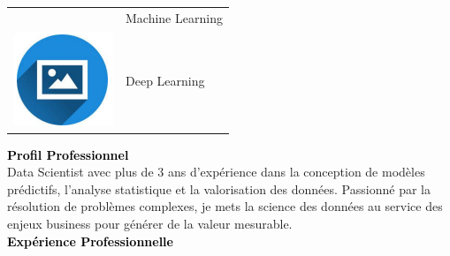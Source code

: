 \documentclass{article}
\begin{document}
\begin{paracol}{2}
\begin{tabular}{ll}
\begin{minipage}{0.1\linewidth}
         \end{minipage} & Machine Learning \\[10pt]
         \begin{minipage}{0.1\linewidth}
         \includegraphics[width=\linewidth]{picon.png}
         \end{minipage} & Deep Learning \\[10pt]
        \end{tabular}
        
\switchcolumn
\color{black}

\textcolor{black}{\Large \textbf{Profil Professionnel}} \\

Data Scientist avec plus de 3 ans d’expérience dans la conception de modèles prédictifs, l’analyse statistique et la valorisation des données. Passionné par la résolution de problèmes complexes, je mets la science des données au service des enjeux business pour générer de la valeur mesurable.\\[8pt]

\textcolor{black}{\Large \textbf{Expérience Professionnelle}} \\


\end{paracol}
\end{document}
